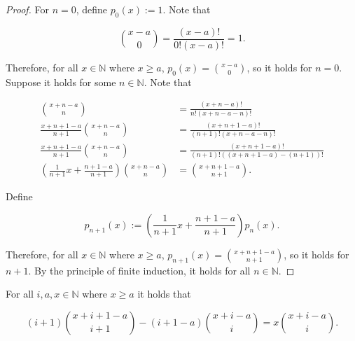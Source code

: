 \documentclass[12pt]{article}
\begin{document}
\begin{proof}

    For $n = 0$, define $p_0(x) := 1$. Note that

    $$
        \binom{x-a}{0} = \frac{(x-a)!}{0!(x-a)!} = 1.
    $$

    Therefore, for all $x \in \mathbb{N}$ where $x \geq a$, $p_0(x) = \binom{x-a}{0}$, so it holds for $n = 0$. Suppose it holds for some $n \in \mathbb{N}$. Note that

    \begin{align*}
        \binom{x+n-a}{n}                                                   & = \frac{(x+n-a)!}{n!(x+n-a-n)!}               \\
        \frac{x+n+1-a}{n+1}\binom{x+n-a}{n}                                & = \frac{(x+n+1-a)!}{(n+1)!(x+n-a-n)!}         \\
        \frac{x+n+1-a}{n+1}\binom{x+n-a}{n}                                & = \frac{(x+n+1-a)!}{(n+1)!((x+n+1-a)-(n+1))!} \\
        \left( \frac{1}{n+1}x + \frac{n+1-a}{n+1} \right) \binom{x+n-a}{n} & = \binom{x+n+1-a}{n+1}.
    \end{align*}

    Define

    $$
        p_{n+1}(x) := \left( \frac{1}{n+1}x + \frac{n+1-a}{n+1} \right)p_n(x).
    $$

    Therefore, for all $\displaystyle x \in \mathbb{N}$ where $x \geq a$, $\displaystyle p_{n+1}(x) = \binom{x+n+1-a}{n+1}$, so it holds for $n+1$. By the principle of finite induction, it holds for all $n \in \mathbb{N}$.

\end{proof}

\vspace{20px}

\begin{lemma}
    \label{degree_elevation_identity}

    For all $i, a, x \in \mathbb{N}$ where $x \geq a$ it holds that

    $$
        (i+1)\binom{x+i+1-a}{i+1} - (i+1-a)\binom{x+i-a}{i} = x\binom{x+i-a}{i}.
    $$

\end{lemma}

\vspace{20px}
\end{document}
